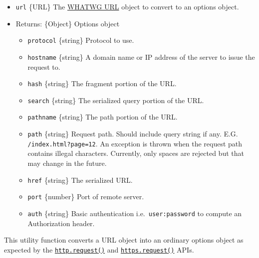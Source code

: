 \begin{itemize}
\tightlist
\item
  \texttt{url} \{URL\} The \hyperref[the-whatwg-url-api]{WHATWG URL}
  object to convert to an options object.
\item
  Returns: \{Object\} Options object

  \begin{itemize}
  \tightlist
  \item
    \texttt{protocol} \{string\} Protocol to use.
  \item
    \texttt{hostname} \{string\} A domain name or IP address of the
    server to issue the request to.
  \item
    \texttt{hash} \{string\} The fragment portion of the URL.
  \item
    \texttt{search} \{string\} The serialized query portion of the URL.
  \item
    \texttt{pathname} \{string\} The path portion of the URL.
  \item
    \texttt{path} \{string\} Request path. Should include query string
    if any. E.G.
    \texttt{\textquotesingle{}/index.html?page=12\textquotesingle{}}. An
    exception is thrown when the request path contains illegal
    characters. Currently, only spaces are rejected but that may change
    in the future.
  \item
    \texttt{href} \{string\} The serialized URL.
  \item
    \texttt{port} \{number\} Port of remote server.
  \item
    \texttt{auth} \{string\} Basic authentication
    i.e.~\texttt{\textquotesingle{}user:password\textquotesingle{}} to
    compute an Authorization header.
  \end{itemize}
\end{itemize}

This utility function converts a URL object into an ordinary options
object as expected by the
\href{http.md\#httprequestoptions-callback}{\texttt{http.request()}} and
\href{https.md\#httpsrequestoptions-callback}{\texttt{https.request()}}
APIs.

